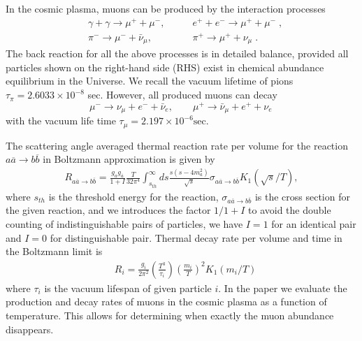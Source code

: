 \documentclass[universe,article,submit,moreauthors,pdftex,a4paper]{Definitions/mdpi}
\begin{document}
In the cosmic plasma, muons can be produced by the interaction processes 
\begin{align} 
&\gamma+\gamma\longrightarrow\mu^++\mu^-,\qquad & e^++e^-\longrightarrow \mu^++\mu^-\;,\\
&\pi^-\longrightarrow\mu^-+\bar{\nu}_\mu,\qquad & \pi^+\longrightarrow\mu^++\nu_\mu\;.
\end{align}
The back reaction for all the above processes is in detailed balance, provided all particles shown on the right-hand side (RHS) exist in chemical abundance equilibrium in the Universe. We recall the vacuum lifetime of pions $\tau_\pi=2.6033\times10^{-8}$ sec. 
However, all produced muons can decay 
\begin{equation}
\mu^-\rightarrow\nu_\mu+e^-+\bar{\nu}_e,\qquad \mu^+\rightarrow\bar{\nu}_\mu+e^++\nu_e\,
\end{equation} 
with the vacuum life time $\tau_{\mu}=2.197 \times 10^{-6}\mathrm{sec}$. 

The scattering angle averaged thermal reaction rate per volume for the reaction $a\overline{a}\rightarrow b\overline{b}$ in Boltzmann approximation is given by \cite{Letessier:2002gp}
\begin{align}\label{pairR}
R_{a\overline{a}\rightarrow b\overline{b}}=\frac{g_ag_{\overline{a}}}{1+I}\frac{T}{32\pi^4}\int_{s_{th}}^\infty ds\frac{s(s-4m^2_a)}{\sqrt{s}}\sigma_{a\overline{a}\rightarrow b\overline{b}} K_1(\sqrt{s}/T),
\end{align}
where $s_{th}$ is the threshold energy for the reaction, $\sigma_{a\overline{a}\rightarrow b\overline{b}}$ is the cross section for the given reaction, and we introduces the factor $1/1+I$ to avoid the double counting of indistinguishable pairs of particles, we have $I=1$ for an identical pair and $I=0$ for distinguishable pair.
Thermal decay rate per volume and time in the Boltzmann limit is~\cite{Kuznetsova:2008jt}
\begin{align}
&R_i=\frac{g_i}{2\pi^2}\left(\frac{T^3}{\tau_i}\right)\left(\frac{m_i}{T}\right)^2K_1(m_i/T) 
\end{align}
where $\tau_i$ is the vacuum lifespan of given particle $i$. In the paper \cite{Rafelski:2021aey} we evaluate the production and decay rates of muons in the cosmic plasma as a function of temperature. This allows for determining when exactly the muon abundance disappears. 
\end{document}
